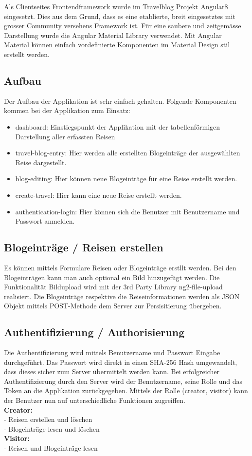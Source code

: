 \documentclass[../main.tex]{subfiles}
\begin{document}
Als Clientseites Frontendframework wurde im Travelblog Projekt Angular8 eingesetzt. Dies aus dem Grund, dass es eine etablierte, breit eingesetztes mit grosser Community versehens Framework ist. Für eine saubere und zeitgemässe Darstellung wurde die Angular Material Library verwendet. Mit Angular Material können einfach vordefinierte Komponenten im Material Design stil erstellt werden.\\
\subsection{Aufbau}
Der Aufbau der Applikation ist sehr einfach gehalten. Folgende Komponenten kommen bei der Applikation zum Einsatz:
\begin{itemize}
    \item dashboard: Einstiegspunkt der Applikation mit der tabellenförmigen Darstellung aller erfassten Reisen
    \item travel-blog-entry: Hier werden alle erstellten Blogeinträge der ausgewählten Reise dargestellt. 
    \item blog-editing: Hier können neue Blogeinträge für eine Reise erstellt werden.
    \item create-travel: Hier kann eine neue Reise erstellt werden.
    \item authentication-login: Hier können sich die Benutzer mit Benutzername und Passwort anmelden.
\end{itemize}

\subsection{Blogeinträge / Reisen erstellen}
Es können mittels Formulare Reisen oder Blogeinträge erstllt werden. Bei den Blogeinträgen kann man auch optional ein Bild hinzugefügt werden. Die Funktionalität Bildupload wird mit der 3rd Party Library ng2-file-upload realisiert. Die Blogeinträge respektive die Reiseinformationen werden als JSON Objekt mittels POST-Methode dem Server zur Persisitierung übergeben.

\subsection{Authentifizierung / Authorisierung}
Die Authentifizierung wird mittels Benutzername und Passwort Eingabe durchgeführt. Das Passwort wird direkt in einen SHA-256 Hash umgewandelt, dass dieses sicher zum Server übermittelt werden kann. Bei erfolgreicher Authentifizierung durch den Server wird der Benutzername, seine Rolle und das Token an die Applikation zurückgegeben. Mittels der Rolle (creator, visitor) kann der Benutzer nun auf unterschiedliche Funktionen zugreiffen.\\

\textbf{Creator:}\\
- Reisen erstellen und löschen \\
- Blogeinträge lesen und löschen\\

\textbf{Visitor:}\\
- Reisen und Blogeinträge lesen\\
\end{document}
